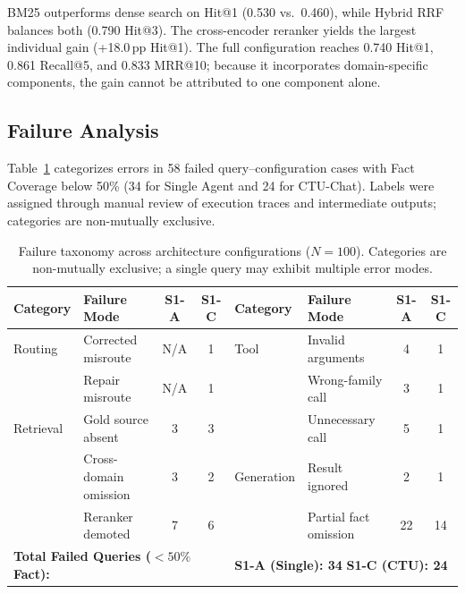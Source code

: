 BM25 outperforms dense search on Hit@1 (0.530 vs.\ 0.460), while Hybrid RRF balances both (0.790 Hit@3). The cross-encoder reranker yields the largest individual gain (+18.0\,pp Hit@1). The full configuration reaches 0.740 Hit@1, 0.861 Recall@5, and 0.833 MRR@10; because it incorporates domain-specific components, the gain cannot be attributed to one component alone.

\subsection{Failure Analysis}
\label{sec:failure_analysis}

Table~\ref{tab:failures} categorizes errors in 58 failed query--configuration cases with Fact Coverage below 50\% (34 for Single Agent and 24 for CTU-Chat). Labels were assigned through manual review of execution traces and intermediate outputs; categories are non-mutually exclusive.

\begin{table}[!htbp]
\centering
\caption{Failure taxonomy across architecture configurations ($N=100$). Categories are non-mutually exclusive; a single query may exhibit multiple error modes.}
\label{tab:failures}
{\footnotesize\setlength{\tabcolsep}{2.2pt}
\begin{tabular}{llcc|llcc}
\toprule
\textbf{Category} & \textbf{Failure Mode} & \textbf{S1-A} & \textbf{S1-C} & \textbf{Category} & \textbf{Failure Mode} & \textbf{S1-A} & \textbf{S1-C} \\
\midrule
Routing   & Corrected misroute     & N/A & 1 & Tool       & Invalid arguments     & 4 & 1 \\
          & Repair misroute         & N/A & 1 &            & Wrong-family call     & 3 & 1 \\
Retrieval & Gold source absent     & 3   & 3 &            & Unnecessary call      & 5 & 1 \\
          & Cross-domain omission  & 3   & 2 & Generation & Result ignored        & 2 & 1 \\
          & Reranker demoted       & 7   & 6 &            & Partial fact omission & 22 & 14 \\
\midrule
\multicolumn{4}{l|}{\textbf{Total Failed Queries ($<50\%$ Fact):}} & \multicolumn{4}{l}{\textbf{S1-A (Single): 34} \qquad \textbf{S1-C (CTU): 24}} \\
\bottomrule
\end{tabular}}
\end{table}

